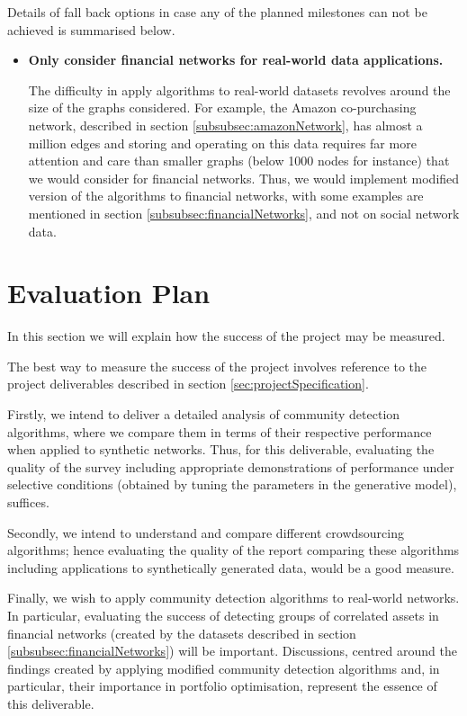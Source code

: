\documentclass[12pt]{article}
\numberwithin{equation}{section}
\begin{document}
Details of fall back options in case any of the planned milestones can not be achieved is summarised below.
\begin{itemize}
	\item \textbf{Only consider financial networks for real-world data applications.}

	The difficulty in apply algorithms to real-world datasets revolves around the size of the graphs considered. For example, the Amazon co-purchasing network, described in section \ref{subsubsec:amazonNetwork}, has almost a million edges and storing and operating on this data requires far more attention and care than smaller graphs (below 1000 nodes for instance) that we would consider for financial networks. Thus, we would implement modified version of the algorithms to financial networks, with some examples are mentioned in section \ref{subsubsec:financialNetworks}, and not on social network data.
\end{itemize}


\newpage
\thispagestyle{plain}
\mbox{}
\section {Evaluation Plan}
\label{sec:evaluationPlan}

In this section we will explain how the success of the project may be measured.

The best way to measure the success of the project involves reference to the project deliverables described in section \ref{sec:projectSpecification}.

Firstly, we intend to deliver a detailed analysis of community detection algorithms, where we compare them in terms of their respective performance when applied to synthetic networks. Thus, for this deliverable, evaluating the quality of the survey including appropriate demonstrations of performance under selective conditions (obtained by tuning the parameters in the generative model), suffices.

Secondly, we intend to understand and compare different crowdsourcing algorithms; hence evaluating the quality of the report comparing these algorithms including applications to synthetically generated data, would be a good measure.

Finally, we wish to apply community detection algorithms to real-world networks. In particular, evaluating the success of detecting groups of correlated assets in financial networks (created by the datasets described in section \ref{subsubsec:financialNetworks}) will be important. Discussions, centred around the findings created by applying modified community detection algorithms and, in particular, their importance in portfolio optimisation, represent the essence of this deliverable.
\end{document}
